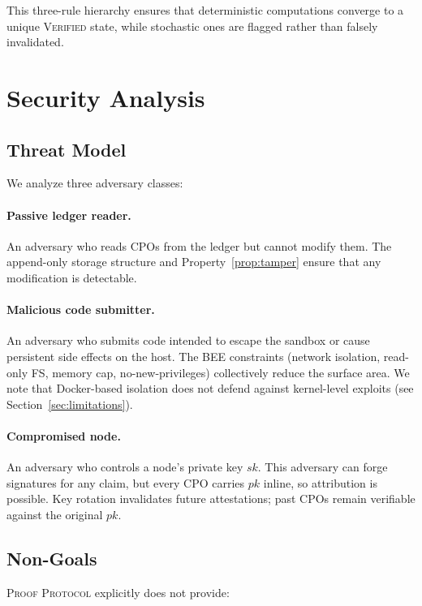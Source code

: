 \documentclass[11pt]{article}
\begin{document}
This three-rule hierarchy ensures that deterministic computations converge
to a unique \textsc{Verified} state, while stochastic ones are flagged
rather than falsely invalidated.

\section{Security Analysis}
\label{sec:security}

\subsection{Threat Model}

We analyze three adversary classes:

\paragraph{Passive ledger reader.}
An adversary who reads CPOs from the ledger but cannot modify them.  The
append-only storage structure and Property~\ref{prop:tamper} ensure that any
modification is detectable.

\paragraph{Malicious code submitter.}
An adversary who submits code intended to escape the sandbox or cause
persistent side effects on the host.  The BEE constraints (network
isolation, read-only FS, memory cap, no-new-privileges) collectively reduce
the surface area.  We note that Docker-based isolation does not defend
against kernel-level exploits (see Section~\ref{sec:limitations}).

\paragraph{Compromised node.}
An adversary who controls a node's private key $\mathit{sk}$.  This
adversary can forge signatures for any claim, but every CPO carries
$\mathit{pk}$ inline, so attribution is possible.  Key rotation invalidates
future attestations; past CPOs remain verifiable against the original
$\mathit{pk}$.

\subsection{Non-Goals}

\textsc{Proof Protocol} explicitly does not provide:
\end{document}

